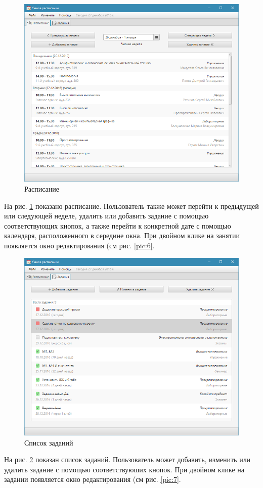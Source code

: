 \begin{figure}[H]
	\begin{center}
		\includegraphics[scale=0.8]{pics/4}
		\caption{Расписание} 
		\label{pic:4} %
	\end{center}
\end{figure}
На рис. \ref{pic:4} показано расписание. Пользователь также может перейти к предыдущей или следующей неделе, удалить или добавить задание с помощью соответствующих кнопок, а также перейти к конкретной дате с помощью календаря, расположенного в середине окна. При двойном клике на занятии появляется окно редактирования (см рис. \ref{pic:6}.

\begin{figure}[H]
	\begin{center}
		\includegraphics[scale=0.8]{pics/5}
		\caption{Список заданий} 
		\label{pic:5} %
	\end{center}
\end{figure}
На рис. \ref{pic:5} показан список заданий. Пользователь может добавить, изменить или удалить задание с помощью соответствуюших кнопок. При двойном клике на задании появляется окно редактирования (см рис. \ref{pic:7}.

